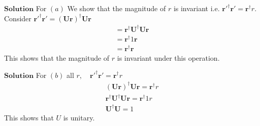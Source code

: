 $\boxed{\textbf{Solution}}$ For $(a)$ We show that the magnitude of $r$ is invariant i.e. $\mathbf{r}'^{\dagger} \mathbf{r}'=\mathbf{r}^{\dagger} r$. Consider $\mathbf{r}'^{\dagger} \mathbf{r}'=(\mathbf{U} \mathbf{r})^{\dagger} \mathbf{U} \mathbf{r}$
$$
\begin{array}{l}
=\mathbf{r}^{\dagger}  \mathbf{U}^{\dagger} \mathbf{U} \mathbf{r} \\
=\mathbf{r}^{\dagger} 1 \mathbf{r} \\
=\mathbf{r}^{\dagger} \mathbf{r}
\end{array}
$$
This shows that the magnitude of $r$ is invariant under this operation.




$\boxed{\textbf{Solution}}$ For $(b)$ all $r, \quad \mathbf{r}'^{\dagger} \mathbf{r}'=\mathbf{r}^{\dagger} r$
$$
\begin{array}{l}
(\mathbf{U} \mathbf{r})^{\dagger} \mathbf{U} \mathbf{r}=\mathbf{r}^{\dagger} r \\
\mathbf{r}^{\dagger}  \mathbf{U}^{\dagger} \mathbf{U} \mathbf{r}=\mathbf{r}^{\dagger} 1 r \\
 \mathbf{U}^{\dagger} \mathbf{U}=1
\end{array}
$$
This shows that $U$ is unitary.
